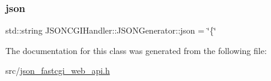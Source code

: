 \subsubsection{\texorpdfstring{json}{json}}
{\footnotesize\ttfamily std\+::string J\+S\+O\+N\+C\+G\+I\+Handler\+::\+J\+S\+O\+N\+Generator\+::json = \char`\"{}\{\char`\"{}\hspace{0.3cm}{\ttfamily [private]}}



The documentation for this class was generated from the following file\+:\begin{DoxyCompactItemize}
\item 
src/\hyperlink{json__fastcgi__web__api_8h}{json\+\_\+fastcgi\+\_\+web\+\_\+api.\+h}\end{DoxyCompactItemize}
